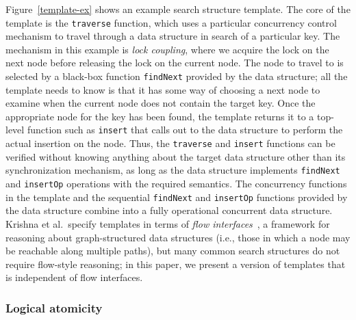 \documentclass[a4paper,UKenglish,cleveref, autoref, thm-restate]{lipics-v2021}
\newcommand{\wm}[1]{\textbf{\textcolor{violet}{[William: #1]}}}
\begin{document}
Figure~\ref{template-ex} shows an example search structure template. The core of the template is the \lstinline{traverse} function, which uses a particular concurrency control mechanism to travel through a data structure in search of a particular key. The mechanism in this example is \emph{lock coupling}, where we acquire the lock on the next node before releasing the lock on the current node. The node to travel to is selected by a black-box function \lstinline{findNext} provided by the data structure; all the template needs to know is that it has some way of choosing a next node to examine when the current node does not contain the target key. Once the appropriate node for the key has been found, the template returns it to a top-level function such as \lstinline{insert} that calls out to the data structure to perform the actual insertion on the node. Thus, the \lstinline{traverse} and \lstinline{insert} functions can be verified without knowing anything about the target data structure other than its synchronization mechanism, as long as the data structure implements \lstinline{findNext} and \lstinline{insertOp} operations with the required semantics. The concurrency functions in the template and the sequential \lstinline{findNext} and \lstinline{insertOp} functions provided by the data structure combine into a fully operational concurrent data structure. Krishna et al.~specify templates in terms of \emph{flow interfaces}~\cite{krishna2017flow}, a framework for reasoning about graph-structured data structures (i.e., those in which a node may be reachable along multiple paths), but many common search structures do not require flow-style reasoning; in this paper, we present a version of templates that is independent of flow interfaces. %

\subsubsection{Logical atomicity} 

\end{document}
